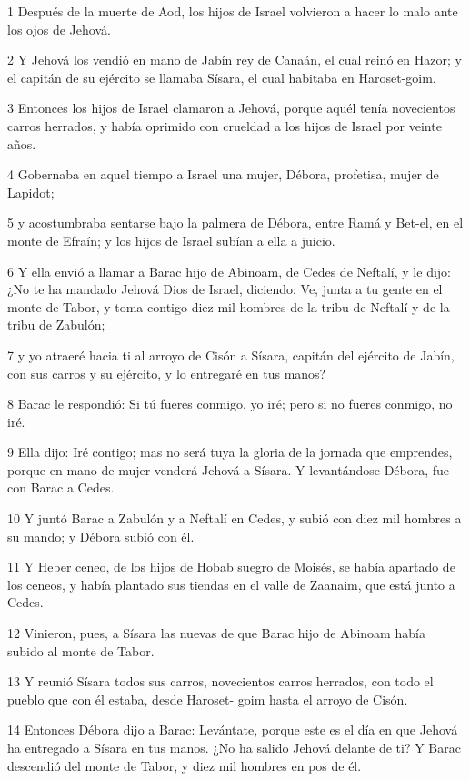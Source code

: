 \par 1 Después de la muerte de Aod, los hijos de Israel volvieron a hacer lo malo ante los ojos de Jehová.
\par 2 Y Jehová los vendió en mano de Jabín rey de Canaán, el cual reinó en Hazor; y el capitán de su ejército se llamaba Sísara, el cual habitaba en Haroset-goim.
\par 3 Entonces los hijos de Israel clamaron a Jehová, porque aquél tenía novecientos carros herrados, y había oprimido con crueldad a los hijos de Israel por veinte años.
\par 4 Gobernaba en aquel tiempo a Israel una mujer, Débora, profetisa, mujer de Lapidot;
\par 5 y acostumbraba sentarse bajo la palmera de Débora, entre Ramá y Bet-el, en el monte de Efraín; y los hijos de Israel subían a ella a juicio.
\par 6 Y ella envió a llamar a Barac hijo de Abinoam, de Cedes de Neftalí, y le dijo: ¿No te ha mandado Jehová Dios de Israel, diciendo: Ve, junta a tu gente en el monte de Tabor, y toma contigo diez mil hombres de la tribu de Neftalí y de la tribu de Zabulón;
\par 7 y yo atraeré hacia ti al arroyo de Cisón a Sísara, capitán del ejército de Jabín, con sus carros y su ejército, y lo entregaré en tus manos?
\par 8 Barac le respondió: Si tú fueres conmigo, yo iré; pero si no fueres conmigo, no iré.
\par 9 Ella dijo: Iré contigo; mas no será tuya la gloria de la jornada que emprendes, porque en mano de mujer venderá Jehová a Sísara. Y levantándose Débora, fue con Barac a Cedes.
\par 10 Y juntó Barac a Zabulón y a Neftalí en Cedes, y subió con diez mil hombres a su mando; y Débora subió con él.
\par 11 Y Heber ceneo, de los hijos de Hobab suegro de Moisés, se había apartado de los ceneos, y había plantado sus tiendas en el valle de Zaanaim, que está junto a Cedes.
\par 12 Vinieron, pues, a Sísara las nuevas de que Barac hijo de Abinoam había subido al monte de Tabor.
\par 13 Y reunió Sísara todos sus carros, novecientos carros herrados, con todo el pueblo que con él estaba, desde Haroset- goim hasta el arroyo de Cisón.
\par 14 Entonces Débora dijo a Barac: Levántate, porque este es el día en que Jehová ha entregado a Sísara en tus manos. ¿No ha salido Jehová delante de ti? Y Barac descendió del monte de Tabor, y diez mil hombres en pos de él.

